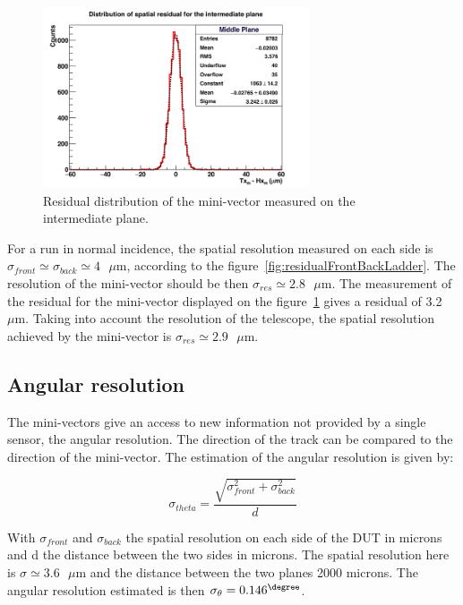     \begin{figure}[!h]
      \centering
      \includegraphics[width = 0.7\textwidth]{Pictures/deformation/hDiffPosX_226056.png}
      \caption{Residual distribution of the mini-vector measured on the intermediate plane.}
      \label{fig:residualMV}
    \end{figure}

    For a run in normal incidence, the spatial resolution measured on each side is $\sigma_{front} \simeq \sigma_{back} \simeq 4 \text{ }\mu\text{m}$, according to the figure~\ref{fig:residualFrontBackLadder}.
    The resolution of the mini-vector should be then $\sigma_{res} \simeq 2.8 \text{ }\mu\text{m}$.
    The measurement of the residual for the mini-vector displayed on the figure~\ref{fig:residualMV} gives a residual of 3.2 $\mu\text{m}$.
    Taking into account the resolution of the telescope, the spatial resolution achieved by the mini-vector is $\sigma_{res} \simeq 2.9 \text{ }\mu\text{m}$.



   \subsection{Angular resolution}

   The mini-vectors give an access to new information not provided by a single sensor, the angular resolution.
   The direction of the track can be compared to the direction of the mini-vector.
   The estimation of the angular resolution is given by:

   \begin{equation}
     \sigma_{theta} = \frac{\sqrt{\sigma_{front}^2 + \sigma_{back}^2}}{d}
     \label{eq:angularResolution}
   \end{equation}

   With $\sigma_{front}$ and $\sigma_{back}$ the spatial resolution on each side of the \gls{DUT} in microns and d the distance between the two sides in microns.
   The spatial resolution here is $\sigma \simeq 3.6 \text{ }\mu\text{m}$ and the distance between the two planes 2000 microns.
   The angular resolution estimated is then $\sigma_{\theta} = 0.146^{\degree}$.  
   
